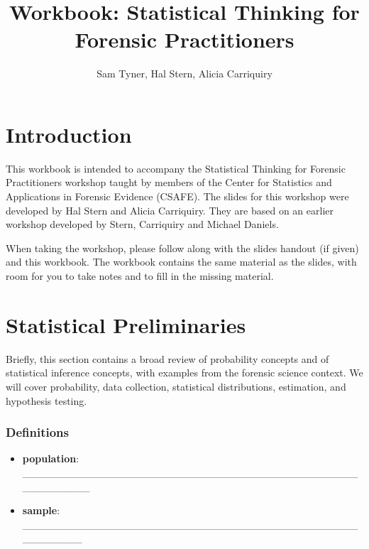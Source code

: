\documentclass[]{book}
\title{Workbook: Statistical Thinking for Forensic Practitioners}
\author{Sam Tyner, Hal Stern, Alicia Carriquiry}
\date{}
\providecommand{\tightlist}{%
  \setlength{\itemsep}{0pt}\setlength{\parskip}{0pt}}
\theoremstyle{definition}
\theoremstyle{definition}
\theoremstyle{remark}
\begin{document}
\maketitle

{
\setcounter{tocdepth}{1}
\tableofcontents
}
\chapter{Introduction}\label{introduction}

This workbook is intended to accompany the Statistical Thinking for
Forensic Practitioners workshop taught by members of the Center for
Statistics and Applications in Forensic Evidence (CSAFE). The slides for
this workshop were developed by Hal Stern and Alicia Carriquiry. They
are based on an earlier workshop developed by Stern, Carriquiry and
Michael Daniels.

When taking the workshop, please follow along with the slides handout
(if given) and this workbook. The workbook contains the same material as
the slides, with room for you to take notes and to fill in the missing
material.

\chapter{Statistical Preliminaries}\label{statistical-preliminaries}

Briefly, this section contains a broad review of probability concepts
and of statistical inference concepts, with examples from the forensic
science context. We will cover probability, data collection, statistical
distributions, estimation, and hypothesis testing. \vspace{-.25in}

\subsection{Definitions}\label{definitions}

\begin{itemize}
\tightlist
\item
  \textbf{population}:
  \_\_\_\_\_\_\_\_\_\_\_\_\_\_\_\_\_\_\_\_\_\_\_\_\_\_\_\_\_\_\_\_\_\_\_\_\_\_\_\_\_\_\_\_\_\_\_\_\_\_\_\_\_\_
\end{itemize}

\vspace{.1in}

\begin{itemize}
\tightlist
\item
  \textbf{sample}:
  \_\_\_\_\_\_\_\_\_\_\_\_\_\_\_\_\_\_\_\_\_\_\_\_\_\_\_\_\_\_\_\_\_\_\_\_\_\_\_\_\_\_\_\_\_\_\_\_\_\_\_\_\_
\end{itemize}
\end{document}
